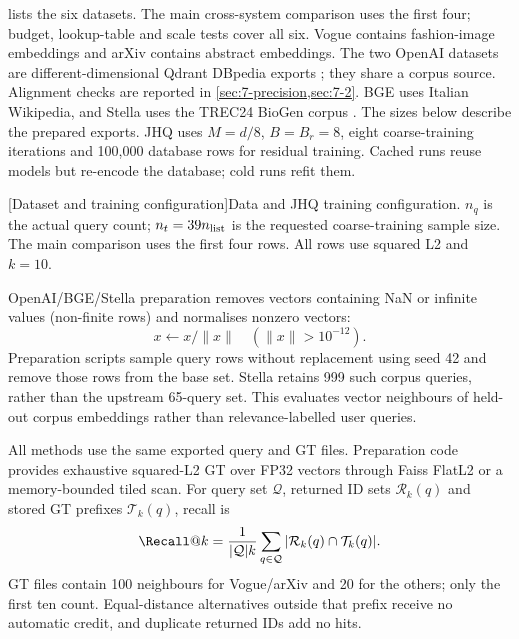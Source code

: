  lists the six datasets. The main cross-system comparison
uses the first four; budget, lookup-table and scale tests cover all six.
Vogue contains fashion-image embeddings and arXiv contains abstract
embeddings. The two OpenAI datasets are different-dimensional Qdrant
DBpedia exports \cite{data_vogue,data_arxiv,data_openai1536,data_openai3072};
they share a corpus source. Alignment checks are reported in
\cref{sec:7-precision,sec:7-2}. BGE uses Italian Wikipedia, and Stella uses
the TREC24 BioGen corpus \cite{data_bge,data_stella}. The sizes below
describe the prepared exports. JHQ uses $M=d/8$, $B=B_r=8$, eight coarse-training iterations and
100,000 database rows for residual training. Cached runs reuse models
but re-encode the database; cold runs refit them.

\par\medskip\noindent\begin{minipage}{\linewidth}
\centering\captionsetup{hypcap=false}
[Dataset and training configuration]{Data and JHQ training configuration. $n_q$ is the actual query count;
$n_t=39n_{\rm list}$ is the requested coarse-training sample size. The main comparison uses
the first four rows. All rows use squared L2 and $k=10$.}
\label{tab:3-data}
\small\setlength{\tabcolsep}{4pt}

\end{minipage}\par\medskip

OpenAI/BGE/Stella preparation removes vectors containing NaN or infinite
values (non-finite rows) and normalises nonzero vectors:
\[
 x\leftarrow x/\|x\|\quad(\|x\|>10^{-12}).
\]
Preparation scripts sample query rows without replacement using seed 42
and remove those rows from the base set. Stella retains 999 such corpus
queries, rather than the upstream 65-query set. This evaluates vector
neighbours of held-out corpus embeddings rather than relevance-labelled
user queries.

All methods use the same exported query and GT files. Preparation code
provides exhaustive squared-L2 GT over FP32 vectors through Faiss FlatL2
or a memory-bounded tiled scan. For query set $\mathcal Q$, returned ID
sets $\mathcal R_k(q)$ and stored GT prefixes $\mathcal T_k(q)$, recall is
\begin{equation}
\Recall@k=\frac{1}{|\mathcal Q|k}
\sum_{q\in\mathcal Q}|\mathcal R_k(q)\cap\mathcal T_k(q)|.
\label{eq:3-recall}
\end{equation}
GT files contain 100 neighbours for Vogue/arXiv and 20 for the others;
only the first ten count. Equal-distance alternatives outside that prefix
receive no automatic credit, and duplicate returned IDs add no hits.

